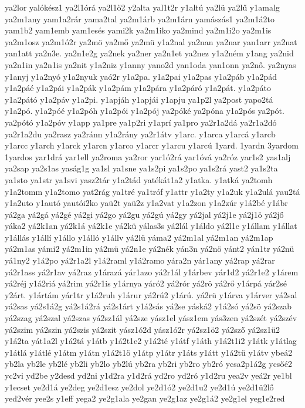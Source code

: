 {ya2lor
yalókész1
ya2l1órá
ya2l1ő2
y2alta
yal1t2r
y1altú
ya2lü
ya2lű
y1amalg
ya2m1any
yam1a2rár
yama2tal
ya2m1árb
ya2m1árn
yamászás1
ya2m1á2to
yam1b2
yam1emb
yam1esés
yami2k
ya2m1iko
ya2mind
ya2m1i2o
ya2m1is
ya2m1osz
ya2m1ó2r
ya2mö
ya2mő
ya2mü
y1a2nal
ya2nan
ya2nar
yan1arr
ya2nat
yan1att
ya2n3e.
ya2n1e2g
ya2nek
ya2ner
ya2n1et
ya2nez
y1a2ném
y1ang
ya2nid
ya2n1in
ya2n1is
ya2nit
y1a2niz
y1anny
yano2d
yan1oda
yan1onn
ya2nő.
ya2nyas
y1anyj
y1a2nyó
y1a2nyuk
yaó2r
y1a2pa.
y1a2pai
y1a2pas
y1a2páb
y1a2pád
y1a2páé
y1a2pái
y1a2pák
y1a2pám
y1a2pára
y1a2páró
y1a2pát.
y1a2páto
y1a2pátó
y1a2páv
y1a2pi.
y1apjáh
y1apjái
y1apju
ya1p2l
ya2post
yapo2tá
y1a2pó.
y1a2póé
y1a2póh
y1a2pói
y1a2pój
ya2póké
ya2póna
y1a2pós
ya2pót.
ya2pótó
y1a2póv
y1app
ya1pre
ya1p2ri
y1aprí
ya1pro
ya2r1a2dá
ya2r1a2dó
ya2r1a2du
ya2rasz
ya2ránn
y1a2rány
ya2r1átv
y1arc.
y1arca
y1arcá
y1arcb
y1arcc
y1arch
y1arck
y1arcn
y1arco
y1arcr
y1arcu
y1arcú
1yard.
1yardn
3yardom
1yardos
yar1drá
yar1ell
ya2roma
ya2ror
yar1ó2rá
yar1óvá
ya2róz
yar1s2
yas1alj
ya2sap
ya2s1as
yaság1g
ya1sl
ya1sne
ya1s2pi
ya1s2po
ya1s2rá
yast2
ya1s2ta
ya1sto
ya1str
ya1svi
yasz2tár
y1a2tád
yatékát1a2
y1atka.
y1atká
ya2tomh
y1a2tomm
y1a2tomo
yat2rág
ya1tré
ya1tróf
y1attr
y1a2ty
y1a2uk
y1a2ulá
yau2tá
y1a2uto
y1autó
yautói2ko
yaü2t
yaü2z
y1a2vat
y1a2zon
y1a2zúr
y1á2bé
y1ábr
yá2ga
yá2gá
yá2gé
yá2gi
yá2go
yá2gu
yá2gú
yá2gy
yá2jal
yá2j1e
yá2j1ö
yá2jő
yáka2
yá2k1an
yá2k1á
yá2k1e
yá2kü
yálas3s
yá2lál
y1áldo
yá2l1e
y1állam
y1állat
y1állás
y1állí
y1állo
y1álló
y1állv
yá2lü
yáma2
yá2m1al
yá2m1an
yá2m1ap
yá2m1as
yámi2
yá2m1in
yá2mü
yá2n1e
yá2nék
yán3n
yá2nö
yánt2
yán1tr
yá2nü
yá1ny2
y1á2po
yá2r1a2l
y1á2raml
y1á2ramo
yára2n
yár1any
yá2rap
yá2rar
yá2r1ass
yá2r1av
yá2raz
y1árazá
yár1azo
yá2r1ál
y1árbev
yár1d2
yá2r1e2
y1árem
yá2réj
y1á2riá
yá2rim
yá2r1is
y1árnya
yáró2
yá2rór
yá2rö
yá2rő
y1árpá
yár2sé
y2árt.
y1ártám
yár1tr
y1á2ruh
y1árur
yá2rú2
y1árú.
yá2rü
y1árva
y1árver
yá2sal
yá2sas
yá2s1á2g
yá2s1á2rá
yá2s1árt
y1á2sás
yá2se
yáská2
y1á2só
yá2sö
yá2szab
yá2szag
yá2szal
yá2szas
yá2sz1ál
yá2sze
yász1el
yász1em
yás3zen
yá2szét
yá2szév
yá2szim
yá2szin
yá2szis
yá2szit
yász1ó2d
yász1ó2r
yá2sz1ö2
yá2sző
yá2sz1ü2
y1á2ta
yát1a2l
y1á2tá
y1átb
y1á2t1e2
y1á2té
y1átf
y1áth
y1á2t1i2
y1átk
y1átlag
y1átlá
y1átlé
y1átm
y1átn
y1á2t1ö
y1átp
y1átr
y1áts
y1átt
y1á2tü
y1átv
ybeá2
yb2la
yb2le
yb2lé
yb2li
yb2lo
yb2lú
yb2ra
yb2ri
yb2ro
yb2ró
ycsa2p1á2g
ycsőé2
yc2vi
yd2be
y2desd
yd2ni
y1d2ra
y1d2rá
yd2ro
yd2ró
y1d2ru
yea2v
yeá2r
ye1bl
y1ecset
ye2d1á
ye2deg
ye2d1esz
ye2dol
ye2d1ó2
ye2d1u2
ye2d1ú
ye2d1ü2lő
yed2vér
yee2s
y1eff
yega2
ye2g1ala
ye2gan
ye2g1az
ye2g1á2
ye2g1el
yeg1e2red
}
